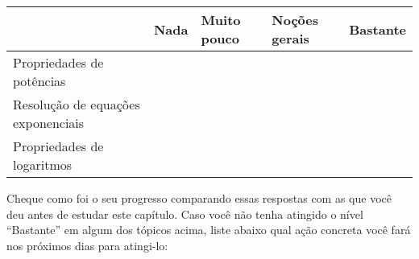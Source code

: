 \documentclass[main.tex]{subfiles}
\begin{document}
\paraFolhaAvaliacoes

\begin{center}
 \begin{tabular}{|p{35mm}||p{15mm}|p{15mm}|p{15mm}|p{15mm}|} 
 \hline
   & Nada & Muito pouco & Noções gerais & Bastante\\
 \hline
 Propriedades de potências &  &  &  &  \\ 
 \hline
 Resolução de equações exponenciais&  &  &  &  \\
 \hline
 Propriedades de logaritmos &  &  &  &  \\
 \hline
\end{tabular}
\end{center}

Cheque como foi o seu progresso comparando essas respostas com as que você deu antes de estudar este capítulo. Caso você não tenha atingido o nível ``Bastante''  em algum dos tópicos acima, liste abaixo qual ação concreta você fará nos próximos dias para atingi-lo:

\paraAmbos
\end{document}
